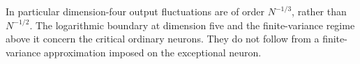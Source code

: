 In particular dimension-four output fluctuations are of order
$N^{-1/3}$, rather than $N^{-1/2}$. The logarithmic boundary at
dimension five and the finite-variance regime above it concern the
critical ordinary neurons. They do not follow from a finite-variance
approximation imposed on the exceptional neuron.
